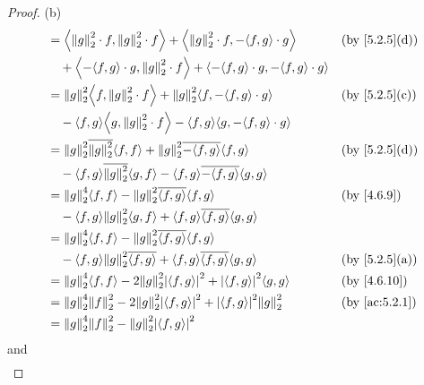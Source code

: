 \begin{proof}{(b)}
\begin{align*}
     & = \inner*{\norm*{g}_2^2 \cdot f, \norm*{g}_2^2 \cdot f} + \inner*{\norm*{g}_2^2 \cdot f, -\inner*{f, g} \cdot g}         &  & \text{(by \cref{5.2.5}(d))} \\
     & \quad + \inner*{-\inner*{f, g} \cdot g, \norm*{g}_2^2 \cdot f} + \inner*{-\inner*{f, g} \cdot g, -\inner*{f, g} \cdot g}                                  \\
     & = \norm*{g}_2^2 \inner*{f, \norm*{g}_2^2 \cdot f} + \norm*{g}_2^2 \inner*{f, -\inner*{f, g} \cdot g}                     &  & \text{(by \cref{5.2.5}(c))} \\
     & \quad - \inner*{f, g} \inner*{g, \norm*{g}_2^2 \cdot f} - \inner*{f, g} \inner*{g, -\inner*{f, g} \cdot g}                                                \\
     & = \norm*{g}_2^2 \overline{\norm*{g}_2^2} \inner*{f, f} + \norm*{g}_2^2 \overline{-\inner*{f, g}} \inner*{f, g}           &  & \text{(by \cref{5.2.5}(d))} \\
     & \quad - \inner*{f, g} \overline{\norm*{g}_2^2} \inner*{g, f} - \inner*{f, g} \overline{-\inner*{f, g}} \inner*{g, g}                                      \\
     & = \norm*{g}_2^4 \inner*{f, f} - \norm*{g}_2^2 \overline{\inner*{f, g}} \inner*{f, g}                                     &  & \by{4.6.9}                  \\
     & \quad - \inner*{f, g} \norm*{g}_2^2 \inner*{g, f} + \inner*{f, g} \overline{\inner*{f, g}} \inner*{g, g}                                                  \\
     & = \norm*{g}_2^4 \inner*{f, f} - \norm*{g}_2^2 \overline{\inner*{f, g}} \inner*{f, g}                                                                      \\
     & \quad - \inner*{f, g} \norm*{g}_2^2 \overline{\inner*{f, g}} + \inner*{f, g} \overline{\inner*{f, g}} \inner*{g, g}      &  & \text{(by \cref{5.2.5}(a))} \\
     & = \norm*{g}_2^4 \inner*{f, f} - 2 \norm*{g}_2^2 \abs{\inner*{f, g}}^2 + \abs{\inner*{f, g}}^2 \inner*{g, g}              &  & \by{4.6.10}                 \\
     & = \norm*{g}_2^4 \norm*{f}_2^2 - 2 \norm*{g}_2^2 \abs{\inner*{f, g}}^2 + \abs{\inner*{f, g}}^2 \norm*{g}_2^2              &  & \by{ac:5.2.1}               \\
     & = \norm*{g}_2^4 \norm*{f}_2^2 - \norm*{g}_2^2 \abs{\inner*{f, g}}^2
  \end{align*}
  and
  \begin{align*}

\end{align*}
\end{proof}

